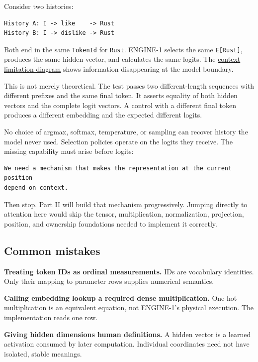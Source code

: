 \documentclass[
  10pt,
]{article}
\begin{document}
Consider two histories:

\begin{verbatim}
History A: I -> like    -> Rust
History B: I -> dislike -> Rust
\end{verbatim}

Both end in the same \texttt{TokenId} for \texttt{Rust}. ENGINE-1
selects the same \texttt{E{[}Rust{]}}, produces the same hidden vector,
and calculates the same logits. The
\href{https://github.com/hermonai/inside-the-llm-engine/blob/astra-visual-rewrite/diagrams/model/context-limitation.txt}{context
limitation diagram} shows information disappearing at the model
boundary.

This is not merely theoretical. The test
\texttt{}
passes two different-length sequences with different prefixes and the
same final token. It asserts equality of both hidden vectors and the
complete logit vectors. A control with a different final token produces
a different embedding and the expected different logits.

No choice of argmax, softmax, temperature, or sampling can recover
history the model never used. Selection policies operate on the logits
they receive. The missing capability must arise before logits:

\begin{verbatim}
We need a mechanism that makes the representation at the current position
depend on context.
\end{verbatim}

Then stop. Part II will build that mechanism progressively. Jumping
directly to attention here would skip the tensor, multiplication,
normalization, projection, position, and ownership foundations needed to
implement it correctly.

\subsection{Common mistakes}\label{common-mistakes-2}

\textbf{Treating token IDs as ordinal measurements.} IDs are vocabulary
identities. Only their mapping to parameter rows supplies numerical
semantics.

\textbf{Calling embedding lookup a required dense multiplication.}
One-hot multiplication is an equivalent equation, not ENGINE-1's
physical execution. The implementation reads one row.

\textbf{Giving hidden dimensions human definitions.} A hidden vector is
a learned activation consumed by later computation. Individual
coordinates need not have isolated, stable meanings.
\end{document}
